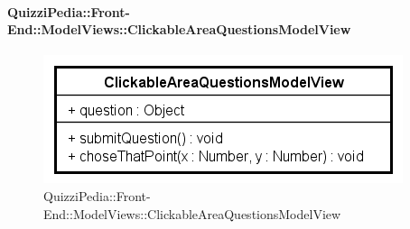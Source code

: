 \paragraph{QuizziPedia::Front-End::ModelViews::ClickableAreaQuestionsModelView}
\begin{figure} [ht]
	\centering
	\includegraphics[scale=0.80]{UML/Classi/Front-End/QuizziPedia_Front-end_ModelView_ClickableAreaQuestionsModelView.png}
	\caption{QuizziPedia::Front-End::ModelViews::ClickableAreaQuestionsModelView}
\end{figure} \FloatBarrier
